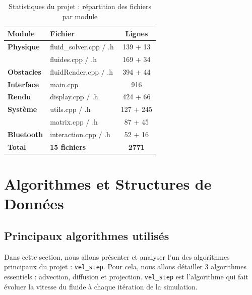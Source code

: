 \documentclass[a4paper]{article}
\begin{document}
    \begin{table}[H]
    \centering
    \renewcommand{\arraystretch}{1.2}
    \begin{tabular}{|l|l|c|}
    \hline
    \textbf{Module} & \textbf{Fichier} & \textbf{Lignes} \\
    \hline
    \textbf{Physique} & fluid\_solver.cpp / .h & 139 + 13 \\
     & fluides.cpp / .h & 169 + 34 \\
    \hline
    \textbf{Obstacles} & fluidRender.cpp / .h & 394 + 44 \\
    \hline
    \textbf{Interface} & main.cpp & 916 \\
    \hline
    \textbf{Rendu} & display.cpp / .h & 424 + 66 \\
    \hline
    \textbf{Système} & utils.cpp / .h & 127 + 245 \\
     & matrix.cpp / .h & 87 + 45 \\
    \hline
    \textbf{Bluetooth} & interaction.cpp / .h & 52 + 16 \\
    \hline
    \textbf{Total} & \textbf{15 fichiers} & \textbf{2771} \\
    \hline
    \end{tabular}
    \caption{Statistiques du projet : répartition des fichiers par module}
    \end{table}


\section{Algorithmes et Structures de Données}\label{sec:algos}
\subsection{Principaux algorithmes utilisés}


\hspace*{\parindent} Dans cette section, nous allons présenter et analyser l'un des algorithmes principaux du projet : \texttt{vel\_step}. Pour cela, nous allons détailler 3 algorithmes essentiels : advection, diffusion et projection. \texttt{vel\_step} est l'algorithme qui fait évoluer la vitesse du fluide à chaque itération de la simulation.
\end{document}
